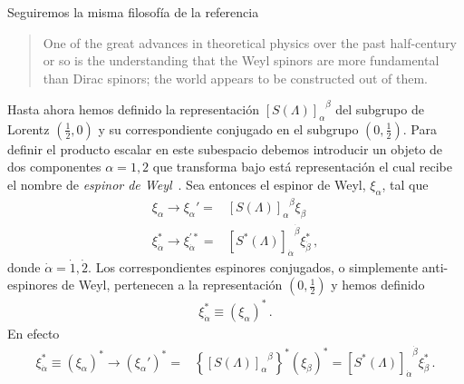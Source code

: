 Seguiremos la misma filosofía de la referencia~\cite{Zee:2016fuk}
\begin{quote}
  One of the great advances in theoretical physics over the past half-century or so is the
understanding that the Weyl spinors are more fundamental than Dirac spinors; the world
appears to be constructed out of them.
\end{quote}

\begin{frame}
  Hasta ahora hemos definido la representación ${[S(\Lambda)]_{\alpha}}^{\beta}$ del subgrupo de Lorentz $(\frac{1}{2},0)$ y su correspondiente conjugado en el subgrupo $(0,\frac{1}{2})$. Para definir el producto escalar en este subespacio debemos introducir un objeto de dos componentes $\alpha=1,2$ que transforma bajo está representación el cual recibe el nombre de \emph{espinor de Weyl}~\cite{Dreiner:2008tw}. Sea entonces el espinor de Weyl, $\xi_{\alpha}$, tal que
\begin{align*}
    \xi_{\alpha} \to \xi_{\alpha}'=&{\left[ S(\Lambda) \right]_{\alpha}}^{\beta}\xi_{\beta} \nonumber\\
  \xi_{\dot{\alpha}}^{*}\to \xi_{\dot{\alpha}}^{\prime *}
  =&{\left[ S^{*}(\Lambda) \right]_{\dot{\alpha}}}^{\dot{\beta}}\xi_{\dot{\beta}}^{*}\,,
\end{align*}
donde $\dot{\alpha}=\dot{1},\dot{2}$.  Los correspondientes espinores conjugados, o simplemente anti-espinores de Weyl, pertenecen a la representación $\left( 0,\frac{1}{2}\right)$ y hemos
definido
\begin{align}
\xi_{\dot{\alpha}}^{*}\equiv  \left( \xi_{\alpha} \right)^{*}\,.
\end{align}
En efecto
\begin{align}
 \xi_{\dot{\alpha}}^{*}\equiv \left( \xi_{\alpha} \right)^{*} \to \left( \xi_{\alpha}' \right)^{*}=&
 \left\{ {\left[ S(\Lambda) \right]_{\alpha}}^{\beta} \right\}^{*} \left( \xi_{\beta} \right)^{*} = {\left[ S^{*}(\Lambda) \right]_{\dot{\alpha}}}^{\dot{\beta}}\xi_{\dot{\beta}}^{*}\,.
\end{align}
  

\end{frame}
